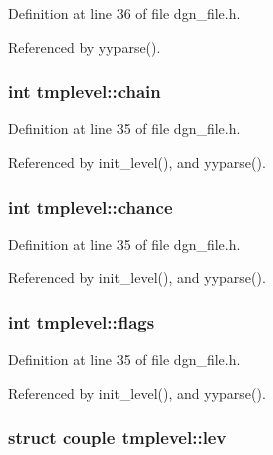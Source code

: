 Definition at line 36 of file dgn\+\_\+file.\+h.



Referenced by yyparse().

\hypertarget{structtmplevel_a8efe919a644ce455b48622cca29a0cf9}{
\subsubsection[{chain}]{\setlength{\rightskip}{0pt plus 5cm}int tmplevel\+::chain}}\label{structtmplevel_a8efe919a644ce455b48622cca29a0cf9}


Definition at line 35 of file dgn\+\_\+file.\+h.



Referenced by init\+\_\+level(), and yyparse().

\hypertarget{structtmplevel_a89b2e83769e060ae5eff2e53d05d5985}{
\subsubsection[{chance}]{\setlength{\rightskip}{0pt plus 5cm}int tmplevel\+::chance}}\label{structtmplevel_a89b2e83769e060ae5eff2e53d05d5985}


Definition at line 35 of file dgn\+\_\+file.\+h.



Referenced by init\+\_\+level(), and yyparse().

\hypertarget{structtmplevel_a29a97121ae74a7520c9580a595a85622}{
\subsubsection[{flags}]{\setlength{\rightskip}{0pt plus 5cm}int tmplevel\+::flags}}\label{structtmplevel_a29a97121ae74a7520c9580a595a85622}


Definition at line 35 of file dgn\+\_\+file.\+h.



Referenced by init\+\_\+level(), and yyparse().

\hypertarget{structtmplevel_ada09b88c0767640ed669ca3c33d4596c}{
\subsubsection[{lev}]{\setlength{\rightskip}{0pt plus 5cm}struct {\bf couple} tmplevel\+::lev}}\label{structtmplevel_ada09b88c0767640ed669ca3c33d4596c}


